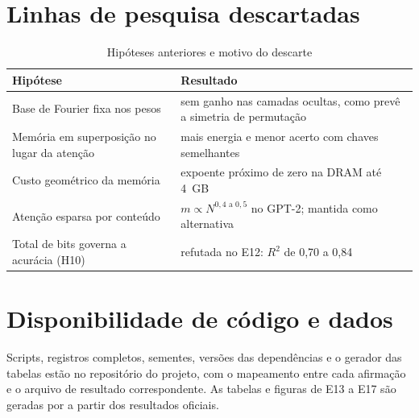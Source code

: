\documentclass[journal]{IEEEtran}
\begin{document}
\section{Linhas de pesquisa descartadas}

\begin{table}[H]
\centering
\caption{Hipóteses anteriores e motivo do descarte}
\label{tab:descartadas}
\begin{tabular}{p{}p{}}
\toprule
Hipótese & Resultado \\
\midrule
Base de Fourier fixa nos pesos & sem ganho nas camadas ocultas, como prevê a simetria de permutação \\
Memória em superposição no lugar da atenção & mais energia e menor acerto com chaves semelhantes \\
Custo geométrico da memória & expoente próximo de zero na DRAM até 4~GB \\
Atenção esparsa por conteúdo & $m \propto N^{0,4\text{ a }0,5}$ no GPT-2; mantida como alternativa \\
Total de bits governa a acurácia (H10) & refutada no E12: $R^2$ de 0,70 a 0,84 \\
\bottomrule
\end{tabular}
\end{table}

\section*{Disponibilidade de código e dados}
{\sloppy Scripts, registros completos, sementes, versões das dependências e o gerador das tabelas estão no repositório do projeto, com o mapeamento entre cada afirmação e o arquivo de resultado correspondente. As tabelas e figuras de E13 a E17 são geradas por  a partir dos resultados oficiais.\par}



\end{document}
